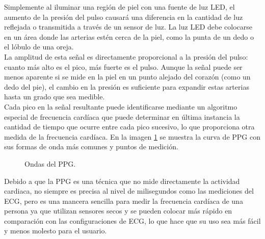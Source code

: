 			Simplemente al iluminar una región de piel con una fuente de luz LED, el aumento de la presión del pulso causará una diferencia en la cantidad de luz reflejada o transmitida a través de un sensor de luz. La luz LED debe colocarse en un área donde las arterias estén cerca de la piel, como la punta de un dedo o el lóbulo de una oreja. \\
			
			La amplitud de esta señal es directamente proporcional a la presión del pulso: cuanto más alto es el pico, más fuerte es el pulso. Aunque la señal puede ser menos aparente si se mide en la piel en un punto alejado del corazón (como un dedo del pie), el cambio en la presión es suficiente para expandir estas arterias hasta un grado que sea medible. \\
			
			Cada pico en la señal resultante puede identificarse mediante un algoritmo especial de frecuencia cardíaca que puede determinar en última instancia la cantidad de tiempo que ocurre entre cada pico sucesivo, lo que proporciona otra medida de la frecuencia cardíaca. En la imagen \ref{fig:PPGwave} se muestra la curva de PPG con sus formas de onda más comunes y puntos de medición. \\
		
		\begin{figure}[htbp!]
			\centering
			\caption{Ondas del PPG.}
			\label{fig:PPGwave}
		\end{figure}
			
			Debido a que la PPG es una técnica que no mide directamente la actividad cardiaca, no siempre es precisa al nivel de milisegundos como las mediciones del ECG, pero es una mancera sencilla para medir la frecuencia cardíaca de una persona ya que utilizan sensores secos y se pueden colocar más rápido en comparación con las configuraciones de ECG, lo que hace que su uso sea más fácil y menos molesto para el usuario.
		
